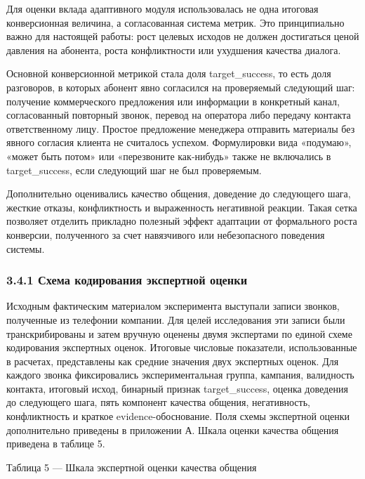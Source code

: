 \documentclass[a4paper,14pt]{extarticle}
\renewcommand{\texttt}[1]{\textnormal{#1}}
\newcommand{\VkrTableCaption}[1]{%
  \Needspace{0.44\textheight}%
  \par\smallskip
  {\singlespacing\noindent #1\par}%
  \vspace{2pt}%
}
\begin{document}
Для оценки вклада адаптивного модуля использовалась не одна итоговая
конверсионная величина, а согласованная система метрик. Это
принципиально важно для настоящей работы: рост целевых исходов не должен
достигаться ценой давления на абонента, роста конфликтности или
ухудшения качества диалога.

Основной конверсионной метрикой стала доля \texttt{target\_\allowbreak{}success}, то
есть доля разговоров, в которых абонент явно согласился на проверяемый
следующий шаг: получение коммерческого предложения или информации в
конкретный канал, согласованный повторный звонок, перевод на оператора
либо передачу контакта ответственному лицу. Простое предложение
менеджера отправить материалы без явного согласия клиента не считалось
успехом. Формулировки вида «подумаю», «может быть потом» или
«перезвоните как-нибудь» также не включались в \texttt{target\_\allowbreak{}success},
если следующий шаг не был проверяемым.

Дополнительно оценивались качество общения, доведение до следующего
шага, жесткие отказы, конфликтность и выраженность негативной реакции.
Такая сетка позволяет отделить прикладно полезный эффект адаптации от
формального роста конверсии, полученного за счет навязчивого или
небезопасного поведения системы.

\subsubsection{3.4.1 Схема кодирования экспертной
оценки}\label{ux441ux445ux435ux43cux430-ux43aux43eux434ux438ux440ux43eux432ux430ux43dux438ux44f-ux44dux43aux441ux43fux435ux440ux442ux43dux43eux439-ux43eux446ux435ux43dux43aux438}

Исходным фактическим материалом эксперимента выступали записи звонков,
полученные из телефонии компании. Для целей исследования эти записи были
транскрибированы и затем вручную оценены двумя экспертами по единой
схеме кодирования экспертных оценок. Итоговые числовые показатели,
использованные в расчетах, представлены как средние значения двух
экспертных оценок. Для каждого звонка фиксировались экспериментальная
группа, кампания, валидность контакта, итоговый исход, бинарный признак
\texttt{target\_\allowbreak{}success}, оценка доведения до следующего шага, пять
компонент качества общения, негативность, конфликтность и краткое
evidence-обоснование. Поля схемы экспертной оценки дополнительно
приведены в приложении А. Шкала оценки качества общения приведена в
таблице 5.

\VkrTableCaption{Таблица 5 --- Шкала экспертной оценки качества общения}
\end{document}
